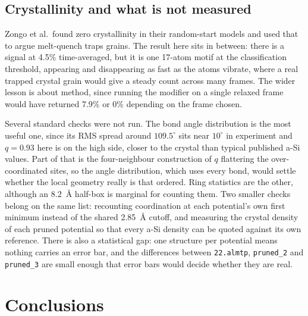 \documentclass[11pt]{article}
\begin{document}
\subsection{Crystallinity and what is not measured}
\label{sec:gaps}
Zongo et al.\ found zero crystallinity in their random-start models and used that to argue melt-quench traps grains. The result here sits in between: there is a signal at 4.5\% time-averaged, but it is one 17-atom motif at the classification threshold, appearing and disappearing as fast as the atoms vibrate, where a real trapped crystal grain would give a steady count across many frames. The wider lesson is about method, since running the modifier on a single relaxed frame would have returned 7.9\% or 0\% depending on the frame chosen.

Several standard checks were not run. The bond angle distribution is the most useful one, since its RMS spread around $109.5^\circ$ sits near $10^\circ$ in experiment and $q = 0.93$ here is on the high side, closer to the crystal than typical published a-Si values. Part of that is the four-neighbour construction of $q$ flattering the over-coordinated sites, so the angle distribution, which uses every bond, would settle whether the local geometry really is that ordered. Ring statistics are the other, although an 8.2~\AA{} half-box is marginal for counting them. Two smaller checks belong on the same list: recounting coordination at each potential's own first minimum instead of the shared 2.85~\AA{} cutoff, and measuring the crystal density of each pruned potential so that every a-Si density can be quoted against its own reference. There is also a statistical gap: one structure per potential means nothing carries an error bar, and the differences between \texttt{22.almtp}, \texttt{pruned\_2} and \texttt{pruned\_3} are small enough that error bars would decide whether they are real.

\section{Conclusions}
\end{document}
